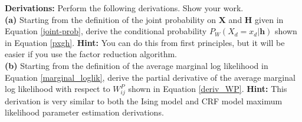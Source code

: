 \documentclass[11pt]{article}
\newcommand{\mbf}[1]{{\mathbf{#1}}}
\begin{document}
\begin{problem}{20} \textbf{Derivations:} Perform the following derivations. Show your work.\\

\textbf{(a)} Starting from the definition of the joint probability on $\mbf{X}$ and $\mbf{H}$ given in Equation \ref{joint-prob}, derive the conditional probability  $P_W(X_d=x_d|\mbf{h})$ shown in Equation \ref{pxgh}. \textbf{Hint:} You can do this from first principles, but it will be easier if you use the factor reduction algorithm.\\

\textbf{(b)} Starting from the definition of the average marginal log likelihood in Equation \ref{marginal_loglik}, derive the partial derivative of the average marginal log likelihood with respect to $W^P_{ij}$ shown in Equation \ref{deriv_WP}. \textbf{Hint:} This derivation is very similar to both the Ising model and CRF model maximum likelihood parameter estimation derivations.
\end{problem}
\end{document}
